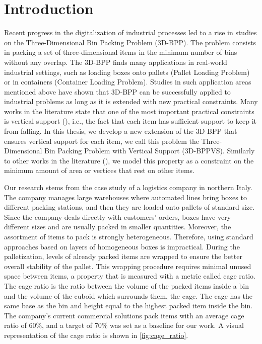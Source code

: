 \documentclass[11pt,a4paper,twocolumn]{article}
\begin{document}
\section{Introduction}
\label{sec:introduction}

Recent progress in the digitalization of industrial processes led to a rise in studies on the Three-Dimensional Bin Packing Problem (3D-BPP).
The problem consists in packing a set of three-dimensional items in the minimum number of bins without any overlap.
The 3D-BPP finds many applications in real-world industrial settings, such as loading boxes onto pallets (Pallet Loading Problem) or in containers (Container Loading Problem). 
Studies in such application areas mentioned above have shown that 3D-BPP can be successfully applied to industrial problems as long as it is extended with new practical constraints. 
Many works in the literature state that one of the most important practical constraints is vertical support (\cite{BORTFELDT20131}), i.e., the fact that each item has sufficient support to keep it from falling.
In this thesis, we develop a new extension of the 3D-BPP that ensures vertical support for each item, we call this problem the Three-Dimensional Bin Packing Problem with Vertical Support (3D-BPPVS).
Similarly to other works in the literature (\cite{GZARA20201062,paquay2016mixed}), we model this property as a constraint on the minimum amount of area or vertices that rest on other items.

Our research stems from the case study of a logistics company in northern Italy.
The company manages large warehouses where automated lines bring boxes to different packing stations, and then they are loaded onto pallets of standard size.
Since the company deals directly with customers' orders, boxes have very different sizes and are usually packed in smaller quantities.
Moreover, the assortment of items to pack is strongly heterogeneous. Therefore, using standard approaches based on layers of homogeneous boxes is impractical.
During the palletization, levels of already packed items are wrapped to ensure the better overall stability of the pallet.
This wrapping procedure requires minimal unused space between items, a property that is measured with a metric called cage ratio.
The cage ratio is the ratio between the volume of the packed items inside a bin and the volume of the cuboid which surrounds them, the cage.
The cage has the same base as the bin and height equal to the highest packed item inside the bin.
The company's current commercial solutions pack items with an average cage ratio of $60\%$, and a target of $70\%$ was set as a baseline for our work.
A visual representation of the cage ratio is shown in \cref{fig:cage_ratio}.
\end{document}
